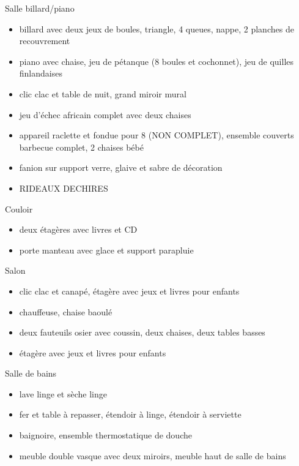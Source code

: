 \documentclass[a4paper,11pt]{article}
\begin{document}
\vspace{0.25cm}

Salle billard/piano
\begin{itemize}
\item billard avec deux jeux de boules, triangle, 4 queues, nappe, 2 planches de recouvrement
\item piano avec chaise, jeu de pétanque (8 boules et cochonnet), jeu de quilles finlandaises
\item clic clac et table de nuit, grand miroir mural
\item jeu d'échec africain complet avec deux chaises
\item appareil raclette et fondue pour 8 (NON COMPLET), ensemble couverts barbecue complet, 2 chaises bébé
\item fanion sur support verre, glaive et sabre de décoration
\item RIDEAUX DECHIRES
\end{itemize}

\vspace{0.25cm}

Couloir
\begin{itemize}
\item deux étagères avec livres et CD
\item porte manteau avec glace et support parapluie
\end{itemize}

\vspace{0.25cm}

Salon
\begin{itemize}
\item clic clac et canapé, étagère avec jeux et livres pour enfants
\item chauffeuse, chaise baoulé
\item deux fauteuils osier avec coussin, deux chaises, deux tables basses
\item étagère avec jeux et livres pour enfants
\end{itemize}


\vspace{0.25cm}

Salle de bains
\begin{itemize}
\item lave linge et sèche linge
\item fer et table à repasser, étendoir à linge, étendoir à serviette
\item baignoire, ensemble thermostatique de douche
\item meuble double vasque avec deux miroirs, meuble haut de salle de bains
\end{itemize}
\end{document}
